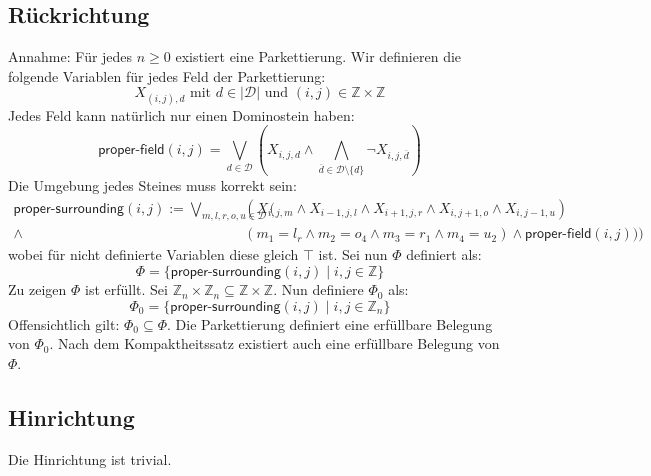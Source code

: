 \documentclass[a4paper,10pt]{article}
\begin{document}
\subsection*{Rückrichtung}
Annahme: Für jedes $n \ge 0$ existiert eine Parkettierung. Wir definieren die folgende Variablen für jedes Feld der Parkettierung:
$$X_{(i,j),d} \text{ mit } d \in |\mathcal{D}| \text{ und } (i,j) \in \mathbb{Z} \times \mathbb{Z}$$
Jedes Feld kann natürlich nur einen Dominostein haben:
$$\textsf{proper-field}(i,j) = \bigvee_{d \in \mathcal{D}} (X_{i,j,d} \land \bigwedge_{\overline{d} \in \mathcal{D}\setminus\{d\} } \lnot X_{i,j,\overline{d}}) $$
Die Umgebung jedes Steines muss korrekt sein:
\begin{align*} \textsf{proper-surrounding} (i,j)  := 
\bigvee_{m,l,r,o,u \in \mathcal{D}} (&(X_{i,j,m} \land X_{i-1,j,l}  \land X_{i+1,j,r}  \land X_{i,j+1,o} \land X_{i,j-1,u} ) \\\land
&(m_1 = l_r \land m_2 = o_4 \land m_3 = r_1 \land m_4 = u_2) \land \textsf{proper-field}(i,j))) \end{align*}
wobei für nicht definierte Variablen diese gleich $\top$ ist.  Sei nun $\Phi$ definiert als: 
$$\Phi = \{\textsf{proper-surrounding}(i,j) \mid i,j \in \mathbb{Z} \}$$
Zu zeigen $\Phi$ ist erfüllt. Sei $\mathbb{Z}_n \times \mathbb{Z}_n \subseteq \mathbb{Z} \times \mathbb{Z}$. Nun definiere $\Phi_0$ als: $$\Phi_0 = \{\textsf{proper-surrounding}(i,j) \mid i,j \in \mathbb{Z}_n \}$$ 
Offensichtlich gilt: $\Phi_0 \subseteq \Phi$. Die Parkettierung definiert eine erfüllbare Belegung von $\Phi_0$. Nach dem Kompaktheitssatz existiert auch eine erfüllbare Belegung von $\Phi$. 
\subsection*{Hinrichtung}
Die Hinrichtung ist trivial.
\end{document}
